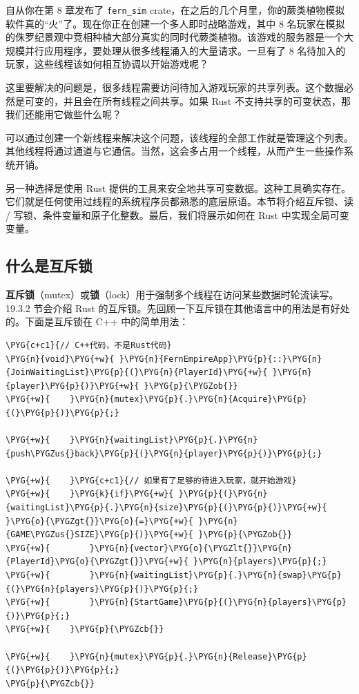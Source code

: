 自从你在第 8 章发布了 \texttt{fern\_sim} crate，在之后的几个月里，你的蕨类植物模拟软件真的“火”了。现在你正在创建一个多人即时战略游戏，其中 8 名玩家在模拟的侏罗纪景观中竞相种植大部分真实的同时代蕨类植物。该游戏的服务器是一个大规模并行应用程序，要处理从很多线程涌入的大量请求。一旦有了 8 名待加入的玩家，这些线程该如何相互协调以开始游戏呢？

这里要解决的问题是，很多线程需要访问待加入游戏玩家的共享列表。这个数据必然是可变的，并且会在所有线程之间共享。如果 Rust 不支持共享的可变状态，那我们还能用它做些什么呢？

可以通过创建一个新线程来解决这个问题，该线程的全部工作就是管理这个列表。其他线程将通过通道与它通信。当然，这会多占用一个线程，从而产生一些操作系统开销。

另一种选择是使用 Rust 提供的工具来安全地共享可变数据。这种工具确实存在。它们就是任何使用过线程的系统程序员都熟悉的底层原语。本节将介绍互斥锁、读 / 写锁、条件变量和原子化整数。最后，我们将展示如何在 Rust 中实现全局可变变量。

\subsection{什么是互斥锁}

\textbf{互斥锁}（mutex）或\textbf{锁}（lock）用于强制多个线程在访问某些数据时轮流读写。19.3.2 节会介绍 Rust 的互斥锁。先回顾一下互斥锁在其他语言中的用法是有好处的。下面是互斥锁在 C++ 中的简单用法：

\begin{Verbatim}[commandchars=\\\{\},breaklines=true,breakanywhere=true,fontsize=\codefont,xleftmargin=17bp]
\PYG{c+c1}{// C++代码，不是Rust代码}
\PYG{n}{void}\PYG{+w}{ }\PYG{n}{FernEmpireApp}\PYG{p}{::}\PYG{n}{JoinWaitingList}\PYG{p}{(}\PYG{n}{PlayerId}\PYG{+w}{ }\PYG{n}{player}\PYG{p}{)}\PYG{+w}{ }\PYG{p}{\PYGZob{}}
\PYG{+w}{    }\PYG{n}{mutex}\PYG{p}{.}\PYG{n}{Acquire}\PYG{p}{(}\PYG{p}{)}\PYG{p}{;}

\PYG{+w}{    }\PYG{n}{waitingList}\PYG{p}{.}\PYG{n}{push\PYGZus{}back}\PYG{p}{(}\PYG{n}{player}\PYG{p}{)}\PYG{p}{;}

\PYG{+w}{    }\PYG{c+c1}{// 如果有了足够的待进入玩家，就开始游戏}
\PYG{+w}{    }\PYG{k}{if}\PYG{+w}{ }\PYG{p}{(}\PYG{n}{waitingList}\PYG{p}{.}\PYG{n}{size}\PYG{p}{(}\PYG{p}{)}\PYG{+w}{ }\PYG{o}{\PYGZgt{}}\PYG{o}{=}\PYG{+w}{ }\PYG{n}{GAME\PYGZus{}SIZE}\PYG{p}{)}\PYG{+w}{ }\PYG{p}{\PYGZob{}}
\PYG{+w}{        }\PYG{n}{vector}\PYG{o}{\PYGZlt{}}\PYG{n}{PlayerId}\PYG{o}{\PYGZgt{}}\PYG{+w}{ }\PYG{n}{players}\PYG{p}{;}
\PYG{+w}{        }\PYG{n}{waitingList}\PYG{p}{.}\PYG{n}{swap}\PYG{p}{(}\PYG{n}{players}\PYG{p}{)}\PYG{p}{;}
\PYG{+w}{        }\PYG{n}{StartGame}\PYG{p}{(}\PYG{n}{players}\PYG{p}{)}\PYG{p}{;}
\PYG{+w}{    }\PYG{p}{\PYGZcb{}}

\PYG{+w}{    }\PYG{n}{mutex}\PYG{p}{.}\PYG{n}{Release}\PYG{p}{(}\PYG{p}{)}\PYG{p}{;}
\PYG{p}{\PYGZcb{}}
\end{Verbatim}


